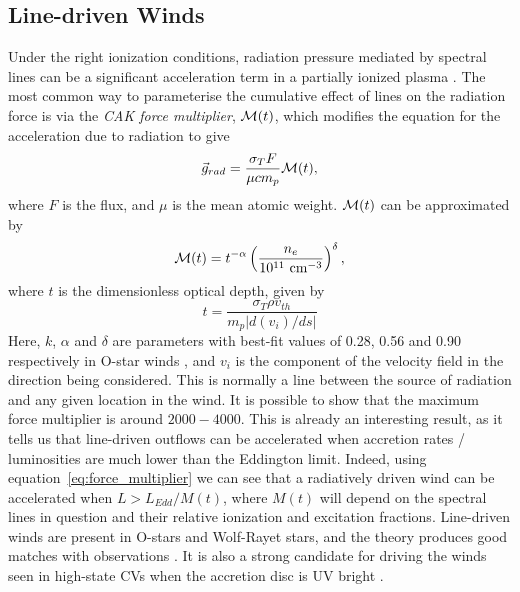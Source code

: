 \subsection{Line-driven Winds}

\label{sec:line_driving}

Under the right ionization conditions, radiation pressure mediated by spectral lines
can be a significant  acceleration term in 
a partially ionized plasma \citep[][hereafter CAK]{CAK75}. 
The most common way to parameterise the cumulative
effect of lines on the radiation force is via the 
{\em CAK force multiplier}, ${\cal M}(t)$,
which modifies the equation for the acceleration due to radiation
to give \citep[][CAK]{castor1974}
\begin{equation}
\label{eq:force_multiplier}
\vec{g}_{rad} = \frac{\sigma_T F}{\mu c m_p} {\cal M}(t),
\end{equation}
where $F$ is the flux, and $\mu$ is the mean atomic weight.
${\cal M}(t)$ can be approximated by \citep{abbott1982}
\begin{equation}
\label{eq:force_multiplier2}
{\cal M}(t) = t^{-\alpha} 
\left( \frac{n_e}{10^{11}~{\rm cm}^{-3}}\right)^\delta,
\end{equation}
where $t$ is the dimensionless optical depth, given by
\begin{equation}
t = \frac{\sigma_T \rho v_{th}}{m_p | d(v_i) / ds |}
\end{equation}
Here, $k$, $\alpha$ and $\delta$ are parameters
with best-fit 
values of 0.28, 0.56 and 0.90 respectively in O-star winds \citep{abbott1982},
and $v_i$ is the component of the velocity field in the direction
being considered. This is normally a line between the source of radiation and any
given location in the wind. 
It is possible to show \citep[CAK, ][]{owocki1988} that the maximum force multiplier
is around $2000-4000$. This is already an interesting result, as it tells us
that line-driven outflows can be accelerated when accretion rates / luminosities
are much lower than the Eddington limit. Indeed, using 
equation~\ref{eq:force_multiplier} we can see that a radiatively driven wind 
can be accelerated when $L > L_{Edd} / M(t)$, where $M(t)$ will depend on
the spectral lines in question and their relative ionization and excitation fractions.
Line-driven winds are present in O-stars and Wolf-Rayet stars, and the theory
produces good matches with observations 
\citep[e.g.][]{friend1986,pauldrach1986,pauldrach1994,hamann2008}. 
It is also a strong candidate for driving
the winds seen in high-state CVs when the accretion disc is UV bright 
\citep[][see also section~\ref{sec:proga}]{pereyra1997,proga1998,proga2005}.

